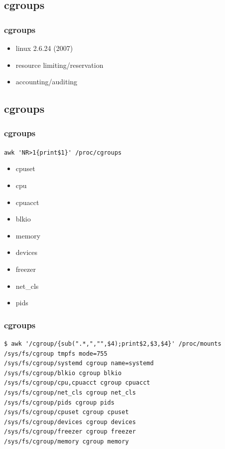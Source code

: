 \documentclass{beamer}
\begin{document}
\subsection{cgroups}

\begin{frame}
    \frametitle{cgroups}
    \begin{itemize}
        \item linux 2.6.24 (2007)
        \item resource limiting/reservation
        \item accounting/auditing
    \end{itemize}
\end{frame}

\subsection{cgroups}

\begin{frame}[fragile]
    \frametitle{cgroups}
    \verb|awk 'NR>1{print$1}' /proc/cgroups|
    \begin{multicols}{3}
        \begin{itemize}
            \item cpuset
            \item cpu
            \item cpuacct
            \item blkio
            \item memory
            \item devices
            \item freezer
            \item net\_cls
            \item pids
        \end{itemize}
    \end{multicols}
\end{frame}

\begin{frame}[fragile]
    \frametitle{cgroups}
    \begin{verbatim}
$ awk '/cgroup/{sub(".*,","",$4);print$2,$3,$4}' /proc/mounts
/sys/fs/cgroup tmpfs mode=755
/sys/fs/cgroup/systemd cgroup name=systemd
/sys/fs/cgroup/blkio cgroup blkio
/sys/fs/cgroup/cpu,cpuacct cgroup cpuacct
/sys/fs/cgroup/net_cls cgroup net_cls
/sys/fs/cgroup/pids cgroup pids
/sys/fs/cgroup/cpuset cgroup cpuset
/sys/fs/cgroup/devices cgroup devices
/sys/fs/cgroup/freezer cgroup freezer
/sys/fs/cgroup/memory cgroup memory
    \end{verbatim}
\end{frame}
\end{document}
